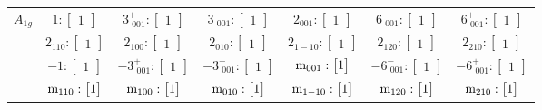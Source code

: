 \documentclass[fleqn,8pt,landscape]{jsarticle}
\begin{document}
\begin{longtable}{ccccccc}
$ A_{1g} $ & $ 1:\begin{bmatrix} 1 \end{bmatrix} $ & $ 3^{+}_{\,\,001}:\begin{bmatrix} 1 \end{bmatrix} $ & $ 3^{-}_{\,\,001}:\begin{bmatrix} 1 \end{bmatrix} $ & $ 2{}_{001}:\begin{bmatrix} 1 \end{bmatrix} $ & $ 6^{-}_{\,\,001}:\begin{bmatrix} 1 \end{bmatrix} $ & $ 6^{+}_{\,\,001}:\begin{bmatrix} 1 \end{bmatrix} $ \\
& $ 2{}_{110}:\begin{bmatrix} 1 \end{bmatrix} $ & $ 2{}_{100}:\begin{bmatrix} 1 \end{bmatrix} $ & $ 2{}_{010}:\begin{bmatrix} 1 \end{bmatrix} $ & $ 2{}_{1-10}:\begin{bmatrix} 1 \end{bmatrix} $ & $ 2{}_{120}:\begin{bmatrix} 1 \end{bmatrix} $ & $ 2{}_{210}:\begin{bmatrix} 1 \end{bmatrix} $ \\
& $ -1:\begin{bmatrix} 1 \end{bmatrix} $ & $ -3^{+}_{\,\,001}:\begin{bmatrix} 1 \end{bmatrix} $ & $ -3^{-}_{\,\,001}:\begin{bmatrix} 1 \end{bmatrix} $ & $ {\rm m}_{001}:\begin{bmatrix} 1 \end{bmatrix} $ & $ -6^{-}_{\,\,001}:\begin{bmatrix} 1 \end{bmatrix} $ & $ -6^{+}_{\,\,001}:\begin{bmatrix} 1 \end{bmatrix} $ \\
& $ {\rm m}_{110}:\begin{bmatrix} 1 \end{bmatrix} $ & $ {\rm m}_{100}:\begin{bmatrix} 1 \end{bmatrix} $ & $ {\rm m}_{010}:\begin{bmatrix} 1 \end{bmatrix} $ & $ {\rm m}_{1-10}:\begin{bmatrix} 1 \end{bmatrix} $ & $ {\rm m}_{120}:\begin{bmatrix} 1 \end{bmatrix} $ & $ {\rm m}_{210}:\begin{bmatrix} 1 \end{bmatrix} $ \\ \hline

\end{longtable}
\end{document}
